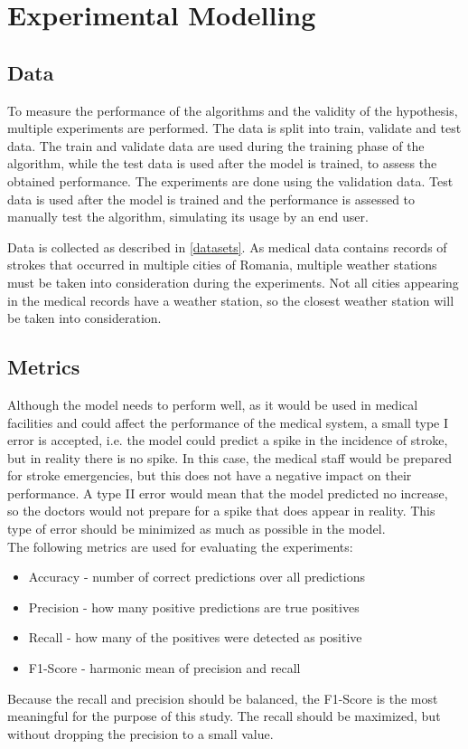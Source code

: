\documentclass{article}
\begin{document}
\section{Experimental Modelling}

\subsection{Data}

To measure the performance of the algorithms and the validity of the hypothesis, multiple experiments are performed. The data is split into train, validate and test data. The train and validate data are used during the training phase of the algorithm, while the test data is used after the model is trained, to assess the obtained performance. The experiments are done using the validation data. Test data is used after the model is trained and the performance is assessed to manually test the algorithm, simulating its usage by an end user. 

Data is collected as described in \ref{datasets}. As medical data contains records of strokes that occurred in multiple cities of Romania, multiple weather stations must be 
taken into consideration during the experiments. Not all cities appearing in the medical records have a weather station, so the closest weather station will be taken into consideration. 


\subsection{Metrics}

Although the model needs to perform well, as it would be used in medical facilities and could affect the performance of the medical system, a small type I error is accepted, i.e. the model could predict a spike in the incidence of stroke, but in reality there is no spike. In this case, the medical staff would be prepared for stroke emergencies, but this does not have a negative impact on their performance. A type II error would mean that the model predicted no increase, so the doctors would not prepare for a spike that does appear in reality. This type of error should be minimized as much as possible in the model.
\\

The following metrics are used for evaluating the experiments:
\begin{itemize}
    \item Accuracy - number of correct predictions over all predictions
    \item Precision - how many positive predictions are true positives
    \item Recall - how many of the positives were detected as positive
    \item F1-Score - harmonic mean of precision and recall
\end{itemize}
Because the recall and precision should be balanced, the F1-Score is the most meaningful for the purpose of this study. The recall should be maximized, but without dropping the precision to a small value.
\end{document}
